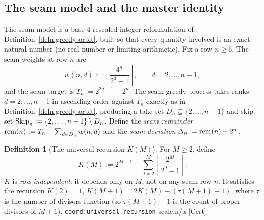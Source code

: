 \documentclass[11pt]{article}
\theoremstyle{plain}
\theoremstyle{definition}
\newtheorem{defn}[thm]{Definition}
\theoremstyle{remark}
\let\origmathrm\mathrm
\renewcommand{\mathrm}[1]{\ifmmode\origmathrm{#1}\else\textrm{#1}\fi}%
\newcommand{\ev}[1]{{\small\textsf{[#1]}}\xspace}
\newcommand{\scale}[1]{{\small\textsf{scale:#1}}\xspace}
\newcommand{\coord}[1]{\texorpdfstring{{\small\nolinkurl{coord:#1}}}{coord:#1}\xspace}
\begin{document}
\subsection{The seam model and the master identity}
\label{ssec:seam-model}

The seam model is a base-$4$ rescaled integer reformulation of Definition~\ref{defn:greedy-orbit},
built so that every quantity involved is an exact natural number (no real-number or limiting
arithmetic). Fix a row $n \ge 6$. The seam weights at row $n$ are
\[
w(n,d) := \left\lfloor \frac{4^n}{2^d-1} \right\rfloor, \qquad d = 2,\dots,n-1,
\]
and the seam target is $T_n := 2^{2n-1} - 2^n$. The seam greedy process takes ranks $d = 2,\dots,n-1$
in ascending order against $T_n$ exactly as in Definition~\ref{defn:greedy-orbit}, producing a take
set $D_n \subseteq \{2,\dots,n-1\}$ and skip set
$\mathrm{Skip}_n := \{2,\dots,n-1\} \mathbin{\backslash} D_n$.
Define the \emph{seam remainder} $\mathrm{rem}(n) := T_n - \sum_{d \in D_n} w(n,d)$ and the
\emph{seam deviation} $\Delta_n := \mathrm{rem}(n) - 2^n$.

\begin{defn}[The universal recursion $K(M)$]
For $M \ge 2$, define
\[
K(M) := 2^{M-1} - \sum_{d=2}^{M} \left\lfloor \frac{2^M}{2^d-1} \right\rfloor.
\]
$K$ is \emph{row-independent}: it depends only on $M$, not on any seam row $n$. It satisfies the
recursion $K(2) = 1$, $K(M+1) = 2K(M) - (\tau(M+1)-1)$, where $\tau$ is the number-of-divisors
function (so $\tau(M+1)-1$ is the count of proper divisors of $M+1$). \coord{universal-recursion}
\scale{n/a} \ev{Cert}
\end{defn}
\end{document}

